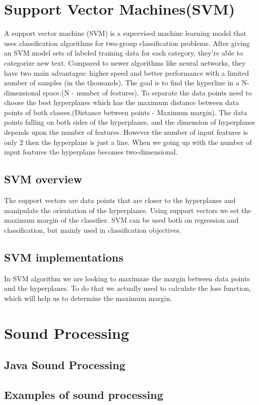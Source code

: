 \documentclass[english,12pt,oneside,a4paper]{article}
\begin{document}
\begin{center}
		\section{Support Vector Machines(SVM)}
		A support vector machine (SVM) is a supervised machine learning model that uses classification algorithms for two-group classification problems. After giving an SVM model sets of labeled training data for each category, they’re able to categorize new text. Compared to newer algorithms like neural networks, they have two main advantages: higher speed and better performance with a limited number of samples (in the thousands).
		The goal is to find the hyperline in a N-dimensional space.(N - number of features). To separate the data points need to choose the best hyperplanes which has the maximum distance between data points of both classes.(Distance between points - Maximum margin). The data points falling on both sides of the hyperplanes, and the dimension of hyperplanes depends upon the number of features. However the number of input features is only 2 then the hyperplane is just a line. When we going up with the number of input features the hyperplane becomes two-dimensional.
		\subsection{SVM overview}
		The support vectors are data points that are closer to the hyperplanes and manipulate the orientation of the hyperplanes. Using support vectors we set the maximum margin of the classifier.
		SVM can be used both on regression and classification, but mainly used in classification objectives.
		\subsection{SVM implementations}
		In SVM algorithm we are looking to maximaze the margin between data points and the hyperplanes. To do that we actually need to calculate the loss function, which will help us to determine the maximum margin.
		\section{Sound Processing}
		
		\subsection{Java Sound Processing}
		
		\subsection{Examples of sound processing}
		

\end{center}
\end{document}
